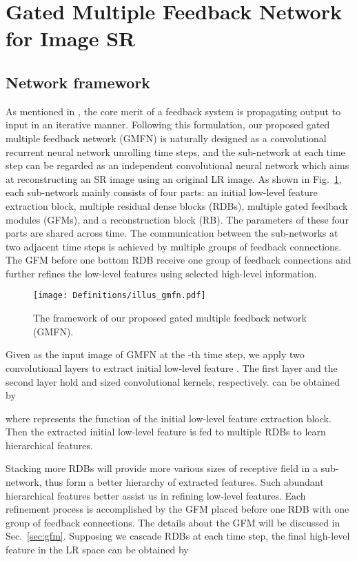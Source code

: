 \documentclass{bmvc2k}
\begin{document}
				\vspace{-4.2mm}	
	\section{Gated Multiple Feedback Network for Image SR}
	\subsection{Network framework}
	As mentioned in \cite{zamir2017feedback, li2019srfbn}, the core merit of a feedback system is propagating output to input in an iterative manner. Following this formulation, our proposed gated multiple feedback network (GMFN) is naturally designed as a convolutional recurrent neural network unrolling  time steps, and the sub-network at each time step can be regarded as an independent convolutional neural network which aims at reconstructing an SR image using an original LR image. As shown in Fig.~\ref{fig:gmfn}, each sub-network mainly consists of four parts: an initial low-level feature extraction block, multiple residual dense blocks (RDBs), multiple gated feedback modules (GFMs), and a reconstruction block (RB). The parameters of these four parts are shared across time. The communication between the sub-networks at two adjacent time steps is achieved by multiple groups of feedback connections. The GFM before one bottom RDB receive one group of feedback connections and further refines the low-level features using selected high-level information.
	
	\label{sec:proposed}
	\begin{figure}[htbp]
		\centering
		\texttt{[image: Definitions/illus\_gmfn.pdf]}
		\vspace{-5mm}
		\caption{The framework of our proposed gated multiple feedback network (GMFN). }
		\label{fig:gmfn}
		\vspace{-5mm}
	\end{figure} 
	
	Given  as the input image of GMFN at the -th time step, we apply two convolutional layers to extract initial low-level feature . The first layer and the second layer hold  and  sized convolutional kernels, respectively.  can be obtained by
	
	where  represents the function of the initial low-level feature extraction block. Then the extracted initial low-level feature  is fed to multiple RDBs to learn hierarchical features. 
	
	Stacking more RDBs will provide more various sizes of receptive field in a sub-network, thus form a better hierarchy of extracted features. 
	Such abundant hierarchical features better assist us in refining low-level features. 
	Each refinement process is accomplished by the GFM placed before one RDB with one group of feedback connections. The details about the GFM will be discussed in Sec.~\ref{sec:gfm}.
	Supposing we cascade  RDBs at each time step, the final high-level feature  in the LR space can be obtained by
	
\end{document}
